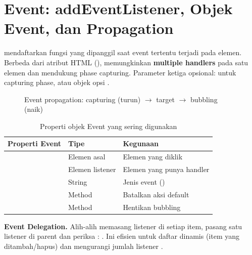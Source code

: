 ﻿\section{Event: addEventListener, Objek Event, dan Propagation}

 mendaftarkan fungsi yang dipanggil saat event tertentu terjadi pada elemen. Berbeda dari atribut HTML (),  memungkinkan \textbf{multiple handlers} pada satu elemen dan mendukung phase capturing. Parameter ketiga opsional:  untuk capturing phase, atau objek opsi  \cite{jsInfo}.

\begin{figure}[H]
\centering
{}
\caption{Event propagation: capturing (turun) $\rightarrow$ target $\rightarrow$ bubbling (naik)}
\end{figure}

\begin{table}[H]
\centering
\scriptsize
\begin{tabular}{|P{3.5cm}|P{2.4cm}|P{2.6cm}|}
\hline
\textbf{Properti Event} & \textbf{Tipe} & \textbf{Kegunaan} \\
\hline
{} & Elemen asal & Elemen yang diklik \\
\hline
{} & Elemen listener & Elemen yang punya handler \\
\hline
{} & String & Jenis event () \\
\hline
{}\linebreak[0] & Method & Batalkan aksi default \\
\hline
{}\linebreak[0] & Method & Hentikan bubbling \\
\hline
\end{tabular}
\caption{Properti objek Event yang sering digunakan}
\end{table}

\begin{konsep}
\textbf{Event Delegation.} Alih-alih memasang listener di setiap item, pasang satu listener di parent dan periksa : . Ini efisien untuk daftar dinamis (item yang ditambah/hapus) dan mengurangi jumlah listener \cite{mdnJsGuide}.
\end{konsep}

